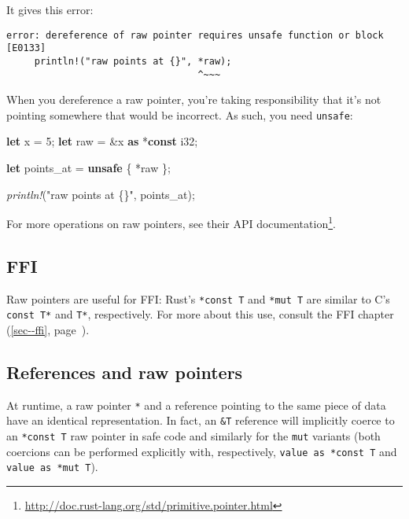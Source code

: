 \documentclass[a4paper,]{book}
\renewcommand*{\hyperref}[2][\ar]{%
  \def\ar{#2}%
  #2 (\autoref{#1}, page~\pageref{#1})}
\newenvironment{Shaded}{\begin{snugshade}}{\end{snugshade}}
\newcommand{\KeywordTok}[1]{\textcolor[rgb]{0.13,0.29,0.53}{\textbf{{#1}}}}
\newcommand{\DataTypeTok}[1]{\textcolor[rgb]{0.13,0.29,0.53}{{#1}}}
\newcommand{\DecValTok}[1]{\textcolor[rgb]{0.00,0.00,0.81}{{#1}}}
\newcommand{\StringTok}[1]{\textcolor[rgb]{0.31,0.60,0.02}{{#1}}}
\newcommand{\PreprocessorTok}[1]{\textcolor[rgb]{0.56,0.35,0.01}{\textit{{#1}}}}
\newcommand{\NormalTok}[1]{{#1}}
\renewcommand{\href}[2]{#2\footnote{\url{#1}}}
\begin{document}
It gives this error:

\begin{verbatim}
error: dereference of raw pointer requires unsafe function or block [E0133]
     println!("raw points at {}", *raw);
                                  ^~~~
\end{verbatim}

When you dereference a raw pointer, you're taking responsibility that
it's not pointing somewhere that would be incorrect. As such, you need
\texttt{unsafe}:

\begin{Shaded}
\begin{Highlighting}[]
\KeywordTok{let} \NormalTok{x = }\DecValTok{5}\NormalTok{;}
\KeywordTok{let} \NormalTok{raw = &x }\KeywordTok{as} \NormalTok{*}\KeywordTok{const} \DataTypeTok{i32}\NormalTok{;}

\KeywordTok{let} \NormalTok{points_at = }\KeywordTok{unsafe} \NormalTok{\{ *raw \};}

\PreprocessorTok{println!}\NormalTok{(}\StringTok{"raw points at \{\}"}\NormalTok{, points_at);}
\end{Highlighting}
\end{Shaded}

For more operations on raw pointers, see
\href{http://doc.rust-lang.org/std/primitive.pointer.html}{their API
documentation}.

\subsection{FFI}\label{ffi}

Raw pointers are useful for FFI: Rust's \texttt{*const\ T} and
\texttt{*mut\ T} are similar to C's \texttt{const\ T*} and \texttt{T*},
respectively. For more about this use, consult the
\hyperref[sec--ffi]{FFI chapter}.

\subsection{References and raw
pointers}\label{references-and-raw-pointers}

At runtime, a raw pointer \texttt{*} and a reference pointing to the
same piece of data have an identical representation. In fact, an
\texttt{\&T} reference will implicitly coerce to an \texttt{*const\ T}
raw pointer in safe code and similarly for the \texttt{mut} variants
(both coercions can be performed explicitly with, respectively,
\texttt{value\ as\ *const\ T} and \texttt{value\ as\ *mut\ T}).
\end{document}
